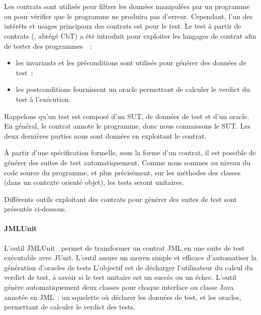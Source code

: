 \section{}
\label{section:sota:cbt}

Les contrats sont utilisés pour {\strong filtrer} les données manipulées par un
programme ou pour vérifier que le programme ne produira pas d'erreur. Cependant,
l'un des intérêts et usages principaux des contrats est pour le {\strong test}.
Le {\strong test à partir de contrats} (,
abrégé CbT) a été introduit pour exploiter les langages de contrat afin de
tester des programmes~~:
%
\begin{itemize}

\item les invariants et les préconditions sont utilisés pour {\strong générer
des données} de test~;

\item les postconditions {\strong fournissent un oracle} permettant de calculer
le verdict du test à l'exécution.

\end{itemize}
%
Rappelons qu'un test est composé d'un SUT, de données de test et d'un oracle. En
général, le contrat annote le programme, donc nous connaissons le SUT. Les deux
dernières parties nous sont données en exploitant le contrat.

À partir d'une spécification formelle, sous la forme d'un contrat, il est
possible de générer des suites de test automatiquement. Comme nous sommes au
niveau du code source du programme, et plus précisément, sur les méthodes des
classes (dans un contexte orienté objet), les tests seront {\strong unitaires}.

Différents outils exploitant des contrats pour générer des suites de test sont
présentés ci-dessous.

\paragraph{JMLUnit} L'outil JMLUnit~ permet de
transformer un contrat JML en une suite de test exécutable avec JUnit. L'outil
assure un moyen simple et efficace d'automatiser la génération d'oracles de
tests L'objectif est de décharger l'utilisateur du calcul du verdict de test, à
savoir si le test unitaire est un succès ou un échec. L'outil génère
automatiquement deux classes pour chaque interface ou classe Java annotée en
JML~: un squelette où déclarer les données de test, et les oracles, permettant
de calculer le verdict des tests.

